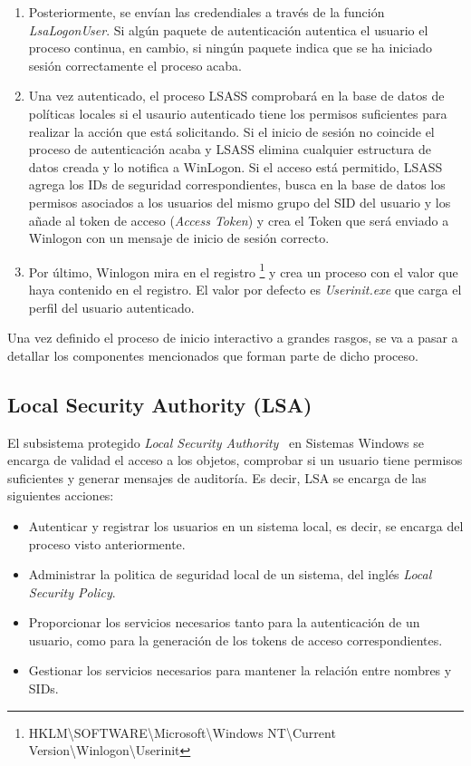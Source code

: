 \begin{enumerate}
\item Posteriormente, se envían las credendiales a través de la función {\it LsaLogonUser}. Si algún paquete de autenticación autentica el usuario el proceso continua, en cambio, si ningún paquete indica que se ha iniciado sesión correctamente el proceso acaba.

\item Una vez autenticado, el proceso LSASS comprobará en la base de datos de políticas locales si el usaurio autenticado tiene los permisos suficientes para realizar la acción que está solicitando. Si el inicio de sesión no coincide el proceso de autenticación acaba y LSASS elimina cualquier estructura de datos creada y lo notifica a WinLogon. Si el acceso está permitido, LSASS agrega los IDs de seguridad correspondientes, busca en la base de datos los permisos asociados a los usuarios del mismo grupo del SID del usuario y los añade al token de acceso ({\it Access Token}) y crea el Token que será enviado a Winlogon con un mensaje de inicio de sesión correcto. 

\item Por último, Winlogon mira en el registro \footnote{HKLM\textbackslash{}SOFTWARE\textbackslash{}Microsoft\textbackslash{}Windows NT\textbackslash{}Current Version\textbackslash{}Winlogon\textbackslash{}Userinit} y crea un proceso con el valor que haya contenido en el registro. El valor por defecto es {\it Userinit.exe} que carga el perfil del usuario autenticado. 

\end{enumerate}

Una vez definido el proceso de inicio interactivo a grandes rasgos, se va a pasar a detallar los componentes mencionados que forman parte de dicho proceso.

\subsection{Local Security Authority (LSA)}

El subsistema protegido {\it Local Security Authority}~\cite{Capitulo2:LSA} en Sistemas Windows se encarga de validad el acceso a los objetos, comprobar si un usuario tiene permisos suficientes y generar mensajes de auditoría. Es decir, LSA se encarga de las siguientes acciones:

\begin{itemize}
\item Autenticar y registrar los usuarios en un sistema local, es decir, se encarga del proceso visto anteriormente. 
\item Administrar la politica de seguridad local de un sistema, del inglés {\it Local Security Policy}.
\item Proporcionar los servicios necesarios tanto para la autenticación de un usuario, como para la generación de los tokens de acceso correspondientes.
\item Gestionar los servicios necesarios para mantener la relación entre nombres y SIDs.
\end{itemize}

